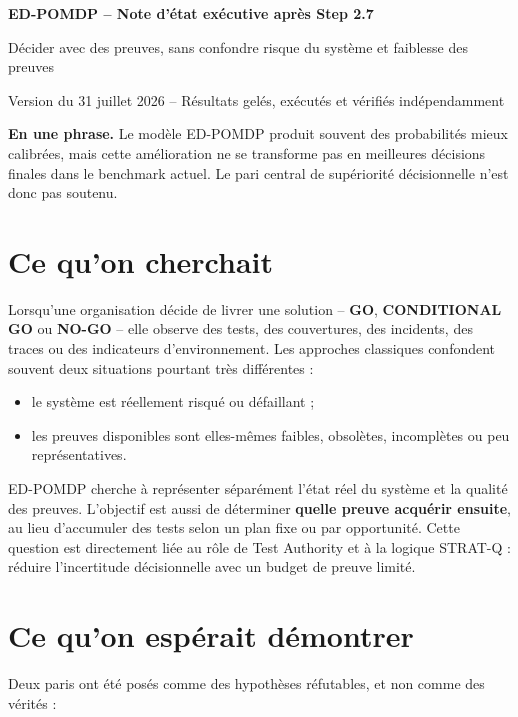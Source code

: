 \documentclass[11pt,a4paper]{article}
\begin{document}
{\LARGE\bfseries\color{deepblue} ED-POMDP -- Note d'état exécutive après Step 2.7}\par
{\large Décider avec des preuves, sans confondre risque du système et faiblesse des preuves}\par
{\color{muted}Version du 31 juillet 2026 -- Résultats gelés, exécutés et vérifiés indépendamment}

\begin{tcolorbox}[colback=softblue,colframe=deepblue,boxrule=0.7pt,arc=2mm]
\textbf{En une phrase.} Le modèle ED-POMDP produit souvent des probabilités mieux calibrées, mais cette amélioration ne se transforme pas en meilleures décisions finales dans le benchmark actuel. Le pari central de supériorité décisionnelle n'est donc pas soutenu.
\end{tcolorbox}

\section*{Ce qu'on cherchait}

Lorsqu'une organisation décide de livrer une solution -- \textbf{GO}, \textbf{CONDITIONAL GO} ou \textbf{NO-GO} -- elle observe des tests, des couvertures, des incidents, des traces ou des indicateurs d'environnement. Les approches classiques confondent souvent deux situations pourtant très différentes :

\begin{itemize}
  \item le système est réellement risqué ou défaillant ;
  \item les preuves disponibles sont elles-mêmes faibles, obsolètes, incomplètes ou peu représentatives.
\end{itemize}

ED-POMDP cherche à représenter séparément l'état réel du système et la qualité des preuves. L'objectif est aussi de déterminer \textbf{quelle preuve acquérir ensuite}, au lieu d'accumuler des tests selon un plan fixe ou par opportunité. Cette question est directement liée au rôle de Test Authority et à la logique STRAT-Q : réduire l'incertitude décisionnelle avec un budget de preuve limité.

\section*{Ce qu'on espérait démontrer}

Deux paris ont été posés comme des hypothèses réfutables, et non comme des vérités :
\end{document}
